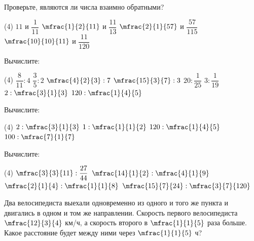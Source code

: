 %
%
\begin{homework}[number=1]
	\begin{listofex}
		\item Проверьте, являются ли числа взаимно обратными?
		\begin{tasks}(4)
			\task \( 11 \) и \( \dfrac{1}{11} \)
			\task \( \mfrac{1}{2}{11} \) и \( \dfrac{11}{13} \)
			\task \( \mfrac{2}{1}{57} \) и \( \dfrac{57}{115} \)
			\task \( \mfrac{10}{10}{11} \) и \( \dfrac{11}{120} \)
		\end{tasks}
		\item Вычислите:
		\begin{tasks}(4)
			\task \( \dfrac{8}{11}:4 \)
			\task \( \dfrac{3}{5}:2 \)
			\task \( \mfrac{4}{2}{3}:7 \)
			\task \( \mfrac{15}{3}{7}:3 \)
			\task \( 20:\dfrac{1}{25} \)
			\task \( 3:\dfrac{1}{19} \)
			\task \( 2:\mfrac{3}{1}{3} \)
			\task \( 120:\mfrac{1}{4}{5} \)
		\end{tasks}
		\item Вычислите:
		\begin{tasks}(4)
			\task \( 2:\mfrac{3}{1}{3} \)
			\task \( 1:\mfrac{1}{1}{2} \)
			\task \( 120:\mfrac{1}{4}{5} \)
			\task \( 100:\mfrac{7}{1}{7} \)
		\end{tasks}
		\item Вычислите:
		\begin{tasks}(4)
			\task \( \mfrac{3}{3}{11}:\dfrac{27}{44} \)
			\task \( \mfrac{14}{1}{2}:\mfrac{4}{1}{9} \)
			\task \( \mfrac{2}{1}{4}:\mfrac{1}{1}{8} \)
			\task \( \mfrac{15}{7}{24}:\mfrac{3}{7}{120} \)
		\end{tasks}
		\item Два велосипедиста выехали одновременно из одного и того же пункта и двигались в одном и том же направлении. Скорость первого велосипедиста \( \mfrac{12}{3}{4} \) км/ч, а скорость второго в \( \mfrac{1}{1}{5} \) раза больше. Какое расстояние будет между ними через \( \mfrac{1}{1}{5} \) ч?
	\end{listofex}
\end{homework}
%
%
